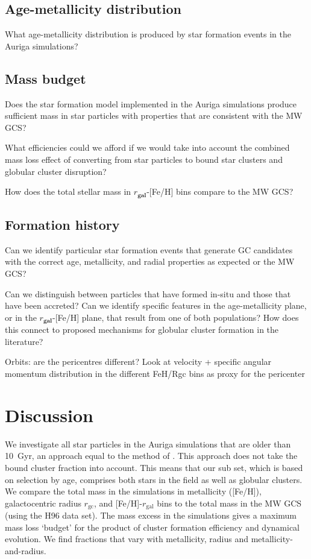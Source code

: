 \documentclass[a4paper,fleqn,usenatbib]{mnras}
\begin{document}
\subsection{Age-metallicity distribution}
\label{sec:agemetallicity}
What age-metallicity distribution is produced by star formation events in the Auriga simulations?




\subsection{Mass budget} 
\label{sec:mass}
Does the star formation model implemented in the Auriga simulations produce sufficient mass in star particles with properties that are consistent with the MW GCS?

What efficiencies could we afford if we would take into account the combined mass loss effect of converting from star particles to bound star clusters and globular cluster disruption?

How does the total stellar mass in $r_\textbf{gal}$-[Fe/H] bins compare to the MW GCS?



\subsection{Formation history} 
\label{sec:history}
Can we identify particular star formation events that generate GC candidates with the correct age, metallicity, and radial properties as expected or the MW GCS?

Can we distinguish between particles that have formed in-situ and those that have been accreted? Can we identify specific features in the age-metallicity plane, or in the $r_\textbf{gal}$-[Fe/H] plane, that result from one of both populations? How does this connect to proposed mechanisms for globular cluster formation in the literature?


Orbits: are the pericentres different? Look at velocity + specific angular momentum distribution in the different FeH/Rgc bins as proxy for the pericenter




\section{Discussion}
\label{sec:discussion}

We investigate all star particles in the Auriga simulations that are older than 10~Gyr,
an approach equal to the method of \citep{2017MNRAS.465.3622R}. This approach does not
take the bound cluster fraction \citep[e.g.][]{2012MNRAS.426.3008K} into account. This
means that our sub set, which is based on selection by age, comprises both stars in the
field as well as globular clusters. We compare the total mass in the simulations in 
metallicity ([Fe/H]), galactocentric radius $r_{\text{gc}}$, and [Fe/H]-$r_{\text{gal}}$ 
bins to the total mass in the MW GCS (using the H96 data set). The mass excess in the
simulations gives a maximum mass loss `budget' for the product of cluster formation 
efficiency and dynamical evolution. We find fractions that vary with metallicity,
radius and metallicity-and-radius.
\end{document}
